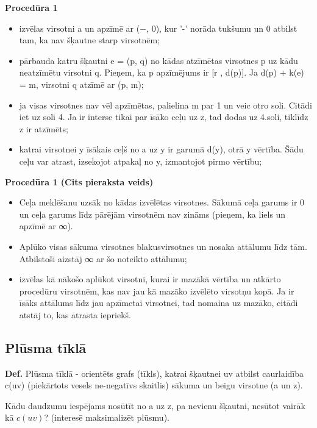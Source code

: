 \documentclass{article}
\begin{document}
\textbf{Procedūra 1}
\begin{itemize}
	\item izvēlas virsotni a un apzīmē ar (−, 0), kur '-' norāda tukšumu un 0 atbilst tam, ka nav šķautne starp virsotnēm;
	\item pārbauda katru šķautni e = (p, q) no kādas atzīmētas virsotnes p uz kādu neatzīmētu virsotni q. Pieņem, ka p apzīmējums ir [r , d(p)]. Ja d(p) + k(e) = m, virsotni q atzīmē ar (p, m);
	\item ja visas virsotnes nav vēl apzīmētas, palielina m par 1 un veic otro soli. Citādi iet uz soli 4. Ja ir interse tikai par īsāko ceļu uz z, tad dodas uz 4.soli, tiklīdz z ir atzīmēts;
	\item katrai virsotnei y īsākais ceļš no a uz y ir garumā d(y), otrā y vērtība. Šādu ceļu var atrast, izsekojot atpakaļ no y, izmantojot pirmo vērtību;
\end{itemize}
	

\textbf{Procedūra 1 (Cits pieraksta veids)}

\begin{itemize}
	\item Ceļa meklēšanu uzsāk no kādas izvēlētas virsotnes. Sākumā ceļa garums ir 0 un ceļa garums līdz pārējām virsotnēm nav zināms (pieņem, ka liels un apzīmē ar ∞).
	\item Aplūko visas sākuma virsotnes blakusvirsotnes un nosaka attālumu līdz tām.  Atbilstoši aizstāj ∞ ar šo noteikto attālumu;
	\item izvēlas kā nākošo aplūkot virsotni, kurai ir mazākā vērtība un atkārto procedūru virsotnēm, kas nav jau kā mazāko izvēlēto virsotņu kopā. Ja ir īsāks attālums līdz jau apzīmetai virsotnei, tad nomaina uz mazāko, citādi atstāj to, kas atrasta iepriekš.
\end{itemize}
	
\subsection{Plūsma tīklā}

\textbf{Def.} Plūsma tīklā - orientēts grafs (tīkls), katrai šķautnei uv atbilst caurlaidība c(uv) (piekārtots vesels ne-negatīvs skaitlis) sākuma un beigu virsotne (a un z).

Kādu daudzumu iespējams nosūtīt no a uz z, pa nevienu šķautni, nesūtot vairāk kā $c(uv)$? (interesē maksimalizēt plūsmu).
\end{document}
